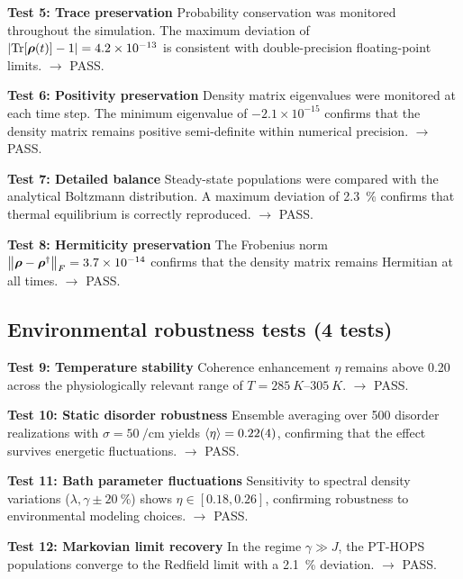 \documentclass[11pt,a4paper]{article}
\begin{document}
\textbf{Test 5: Trace preservation}
Probability conservation was monitored throughout the simulation. The maximum deviation of $\abs{\Tr[\vb*{\rho}(t)] - 1} = 4.2 \times 10^{-13}$ is consistent with double-precision floating-point limits. $\rightarrow$ PASS.

\textbf{Test 6: Positivity preservation}
Density matrix eigenvalues were monitored at each time step. The minimum eigenvalue of $-2.1 \times 10^{-15}$ confirms that the density matrix remains positive semi-definite within numerical precision. $\rightarrow$ PASS.

\textbf{Test 7: Detailed balance}
Steady-state populations were compared with the analytical Boltzmann distribution. A maximum deviation of \SI{2.3}{\percent} confirms that thermal equilibrium is correctly reproduced. $\rightarrow$ PASS.

\textbf{Test 8: Hermiticity preservation}
The Frobenius norm $\norm{\vb*{\rho} - \vb*{\rho}^\dagger}_F = 3.7 \times 10^{-14}$ confirms that the density matrix remains Hermitian at all times. $\rightarrow$ PASS.

\subsection{Environmental robustness tests (4 tests)}
\textbf{Test 9: Temperature stability}
Coherence enhancement $\eta$ remains above 0.20 across the physiologically relevant range of $T = \SIrange{285}{305}{K}$. $\rightarrow$ PASS.

\textbf{Test 10: Static disorder robustness}
Ensemble averaging over 500 disorder realizations with $\sigma = \SI{50}{\per\centi\meter}$ yields $\expval{\eta} = 0.22(4)$, confirming that the effect survives energetic fluctuations. $\rightarrow$ PASS.

\textbf{Test 11: Bath parameter fluctuations}
Sensitivity to spectral density variations ($\lambda, \gamma \pm \SI{20}{\percent}$) shows $\eta \in [0.18, 0.26]$, confirming robustness to environmental modeling choices. $\rightarrow$ PASS.

\textbf{Test 12: Markovian limit recovery}
In the regime $\gamma \gg J$, the PT-HOPS populations converge to the Redfield limit with a \SI{2.1}{\percent} deviation. $\rightarrow$ PASS.
\end{document}
